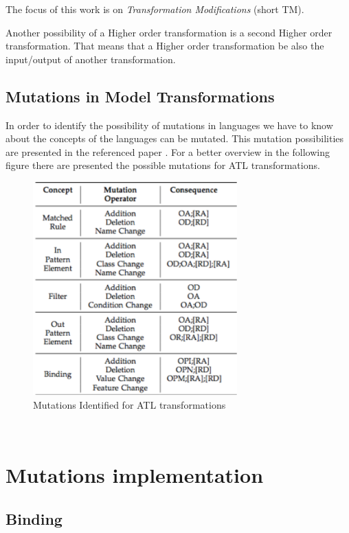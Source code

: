 \documentclass{llncs}
\begin{document}
The focus of this work is on \textit{Transformation Modifications} (short TM). 

Another possibility of a Higher order transformation is a second Higher order
transformation. That means that a Higher order transformation be also the
input/output of another transformation.

\subsection{Mutations in Model Transformations}
In order to identify the possibility of mutations in languages we have to know
about the concepts of the languages can be mutated. This mutation possibilities
are presented in the referenced paper \cite{troya:2015}. For a better overview
in the following figure there are presented the possible mutations for ATL
transformations.\label{fig:mutations_ATL}

 \begin{figure}[tb]
	\centering
	\includegraphics[width=0.7\textwidth,natwidth=610,natheight=642]{figures/Mutations_Identified_for_ATL.pdf}
	\caption{Mutations Identified for ATL transformations}
	\label{fig:mutations_ATL}
\end{figure}~\cite{troya:2015}



\section{Mutations implementation}

\subsection{Binding}
\end{document}
